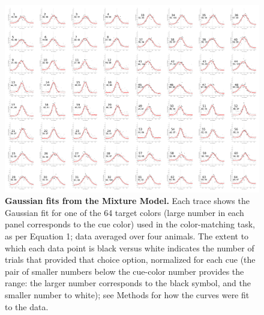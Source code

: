 \documentclass[9pt,biorxiv,lineno,onehalfspacing]{lapreprint}
\begin{document}
\begin{figure}
    \centering
    \begin{fullwidth}
    \includegraphics[width=\textwidth+4cm]{Outputs/Paper/Figures/flat/SI3_MMBreakOut_2.jpg}
    \caption{\textbf{Gaussian fits from the Mixture Model.}
    Each trace shows the Gaussian fit for one of the 64 target colors (large number in each panel corresponds to the cue color) used in the color-matching task, as per Equation 1; data averaged over four animals. The extent to which each data point is black versus white indicates the number of trials that provided that choice option, normalized for each cue (the pair of smaller numbers below the cue-color number provides the range: the larger number corresponds to the black symbol, and the smaller number to white); see Methods for how the curves were fit to the data. 
    } 
    \label{fig:MMBreakOut}
    \end{fullwidth}
\end{figure}
\end{document}

